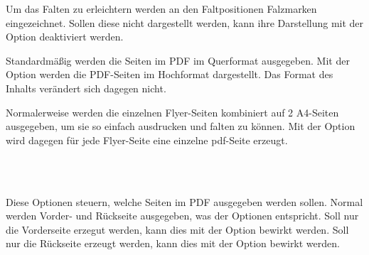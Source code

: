 \begin{Declaration}
\end{Declaration}
Um das Falten zu erleichtern werden an den Faltpositionen Falzmarken
eingezeichnet. Sollen diese nicht dargestellt werden, kann ihre
Darstellung mit der Option  deaktiviert werden.

\begin{Declaration}
\end{Declaration}

Standardmäßig werden die Seiten im PDF im Querformat ausgegeben.
Mit der Option  werden die PDF-Seiten im Hochformat dargestellt.
Das Format des Inhalts verändert sich dagegen nicht.

\begin{Declaration}
\end{Declaration}
Normalerweise werden die einzelnen Flyer-Seiten kombiniert auf 2 A4-Seiten
ausgegeben, um sie so einfach ausdrucken und falten zu können.
Mit der Option  wird dagegen für jede Flyer-Seite eine
einzelne pdf-Seite erzeugt.

\begin{Declaration}
  \\
  \\
\end{Declaration}
Diese Optionen steuern, welche Seiten im PDF ausgegeben werden sollen.
Normal werden Vorder- und Rückseite ausgegeben, was der Optionen
 entspricht.
Soll nur die Vorderseite erzegut werden, kann dies mit der Option
 bewirkt werden.
Soll nur die Rückseite erzeugt werden, kann dies mit der Option
 bewirkt werden.
